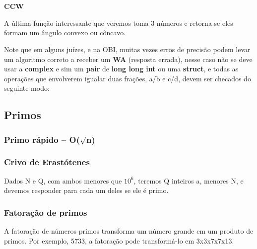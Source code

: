 \documentclass[a4paper,12pt]{article}
\begin{document}

\\~\\\noindent\textbf{CCW}

\noindent A última função interessante que veremos toma 3 números e retorna se eles formam um ângulo convexo ou côncavo.


\noindent Note que em alguns juízes, e na OBI, muitas vezes erros de precisão podem levar um algoritmo correto a receber um \textbf{WA} (resposta errada), nesse caso não se deve usar a \textbf{complex} e sim um \textbf{pair} de \textbf{long long int} ou uma \textbf{struct}, e todas as operações que envolverem igualar duas frações, a/b e c/d, devem ser checados do seguinte modo:




\subsection{Primos}

\subsubsection{Primo rápido – O($\surd$n)}


\subsubsection{Crivo de Erastótenes}
\indent Dados N e Q, com ambos menores que $10^6$, teremos Q inteiros a, menores N, e devemos responder para cada um deles se ele é primo.

\subsubsection{Fatoração de primos}
A fatoração de números primos transforma um número grande em um produto de primos. Por exemplo, 5733, a fatoração pode transformá-lo em 3x3x7x7x13.
\end{document}
